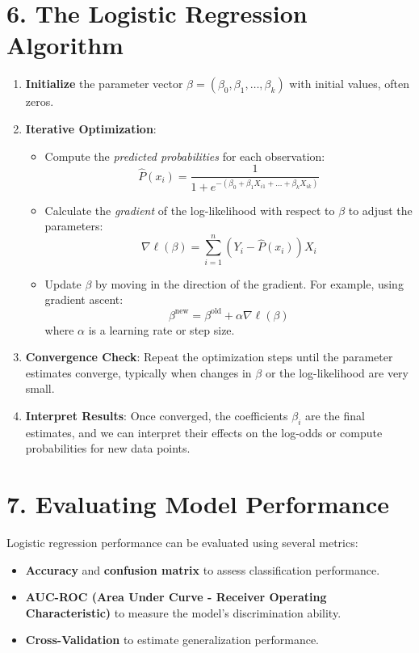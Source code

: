 \documentclass{article}
\begin{document}
\section*{6. The Logistic Regression Algorithm}

\begin{enumerate}
    \item \textbf{Initialize} the parameter vector \( \beta = (\beta_0, \beta_1, \dots, \beta_k) \) with initial values, often zeros.
    
    \item \textbf{Iterative Optimization}:
    \begin{itemize}
        \item Compute the \textit{predicted probabilities} for each observation:
        \[
        \hat{P}(x_i) = \frac{1}{1 + e^{-(\beta_0 + \beta_1 X_{i1} + \dots + \beta_k X_{ik})}}
        \]
        \item Calculate the \textit{gradient} of the log-likelihood with respect to \( \beta \) to adjust the parameters:
        \[
        \nabla \ell(\beta) = \sum_{i=1}^n \left( Y_i - \hat{P}(x_i) \right) X_i
        \]
        \item Update \( \beta \) by moving in the direction of the gradient. For example, using gradient ascent:
        \[
        \beta^{\text{new}} = \beta^{\text{old}} + \alpha \nabla \ell(\beta)
        \]
        where \( \alpha \) is a learning rate or step size.
    \end{itemize}
    
    \item \textbf{Convergence Check}: Repeat the optimization steps until the parameter estimates converge, typically when changes in \( \beta \) or the log-likelihood are very small.

    \item \textbf{Interpret Results}: Once converged, the coefficients \( \beta_i \) are the final estimates, and we can interpret their effects on the log-odds or compute probabilities for new data points.
\end{enumerate}

\section*{7. Evaluating Model Performance}

Logistic regression performance can be evaluated using several metrics:
\begin{itemize}
    \item \textbf{Accuracy} and \textbf{confusion matrix} to assess classification performance.
    \item \textbf{AUC-ROC (Area Under Curve - Receiver Operating Characteristic)} to measure the model’s discrimination ability.
    \item \textbf{Cross-Validation} to estimate generalization performance.
\end{itemize}
\end{document}
